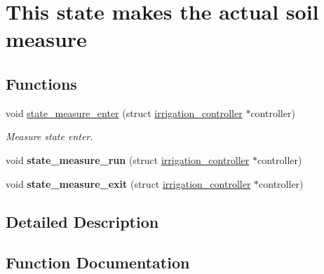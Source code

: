 \hypertarget{group__state__measure}{}\section{This state makes the actual soil measure}
\label{group__state__measure}
\subsection*{Functions}
\begin{DoxyCompactItemize}
\item 
void \hyperlink{group__state__measure_ga24a42892ba25be220bff68fc151e0be7}{state\+\_\+measure\+\_\+enter} (struct \hyperlink{structirrigation__controller}{irrigation\+\_\+controller} $\ast$controller)
\begin{DoxyCompactList}\small\item\em Measure state enter. \end{DoxyCompactList}\item 
\hypertarget{group__state__measure_ga410776694bde81bde92a0b6b178ac015}{}void {\bfseries state\+\_\+measure\+\_\+run} (struct \hyperlink{structirrigation__controller}{irrigation\+\_\+controller} $\ast$controller)\label{group__state__measure_ga410776694bde81bde92a0b6b178ac015}

\item 
\hypertarget{group__state__measure_ga0f85f8645f5311e776e85a3697517266}{}void {\bfseries state\+\_\+measure\+\_\+exit} (struct \hyperlink{structirrigation__controller}{irrigation\+\_\+controller} $\ast$controller)\label{group__state__measure_ga0f85f8645f5311e776e85a3697517266}

\end{DoxyCompactItemize}


\subsection{Detailed Description}


\subsection{Function Documentation}
\hypertarget{group__state__measure_ga24a42892ba25be220bff68fc151e0be7}{}
